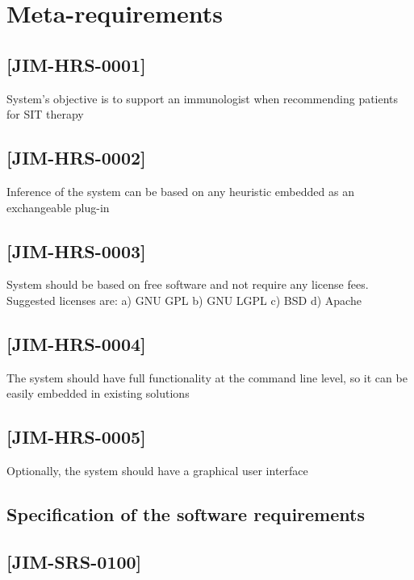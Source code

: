 \documentclass[10pt,oneside]{memoir}
\begin{document}
\chapter{Meta-requirements}
\label{meta-requirements}

\section{[JIM-HRS-0001]}
\label{jim-hrs-0001}

System's objective is to support an immunologist when recommending patients for SIT therapy


\section{[JIM-HRS-0002]}
\label{jim-hrs-0002}

Inference of the system can be based on any heuristic embedded as an exchangeable plug-in


\section{[JIM-HRS-0003]}
\label{jim-hrs-0003}

System should be based on free software and not require any license fees. Suggested licenses are:
a) GNU GPL
b) GNU LGPL
c) BSD
d) Apache


\section{[JIM-HRS-0004]}
\label{jim-hrs-0004}

The system should have full functionality at the command line level, so it can be easily embedded in existing solutions


\section{[JIM-HRS-0005]}
\label{jim-hrs-0005}

Optionally, the system should have a graphical user interface


\section{Specification of the software requirements}
\label{specificationofthesoftwarerequirements}

\section{[JIM-SRS-0100]}
\label{jim-srs-0100}
\end{document}
